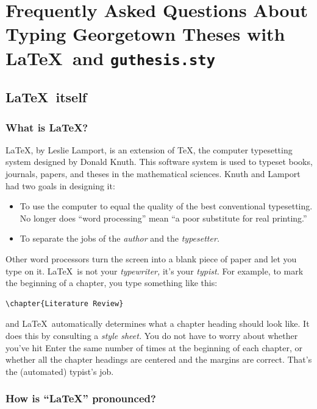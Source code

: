 \documentclass[12pt]{report}
\begin{document}
\chapter{Frequently Asked Questions About Typing Georgetown Theses with
\LaTeX\ and {\tt guthesis.sty}}

\section{\LaTeX\ itself}

\subsection{What is \LaTeX?}

\LaTeX, by Leslie Lamport, is an extension of \TeX, the computer typesetting
system designed by Donald Knuth.  This software system is used to typeset
books, journals, papers, and theses in the mathematical sciences.
Knuth and Lamport had two goals in designing it:
\begin{itemize}
\item To use the computer to equal the quality of the best conventional
typesetting.
No longer does ``word processing'' mean ``a poor substitute for real
printing.''
\item To separate the jobs of the \emph{author} and the \emph{typesetter.}
\end{itemize}
Other word processors turn the screen into a blank piece of paper and let
you type on it.  \LaTeX\ is not your \emph{typewriter,} it's your
\emph{typist.}  For example, to mark the beginning of a chapter, you
type something like this:
\begin{verbatim}
\chapter{Literature Review}
\end{verbatim}
and \LaTeX\ automatically determines what a chapter heading should look like.
It does this by consulting a \emph{style sheet.}  You do not have to worry
about whether you've hit Enter the same number of times at the beginning of
each chapter, or whether all the chapter headings are centered and the
margins are correct.  That's the (automated) typist's job.

\subsection{How is ``\LaTeX'' pronounced?}
\end{document}

